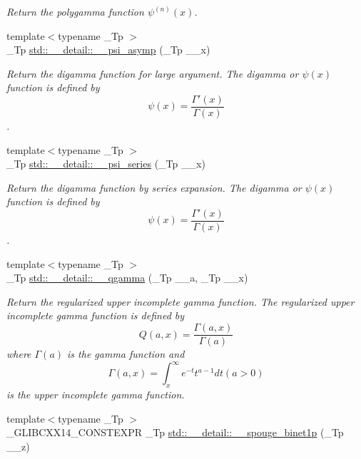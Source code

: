 \begin{DoxyCompactItemize}
\begin{DoxyCompactList}\small\item\em Return the polygamma function $ \psi^{(n)}(x) $. \end{DoxyCompactList}\item 
{\footnotesize template$<$typename \+\_\+\+Tp $>$ }\\\+\_\+\+Tp \hyperlink{namespacestd_1_1____detail_a2557b5d815b6667bc9228c1e8a2a16ae}{std\+::\+\_\+\+\_\+detail\+::\+\_\+\+\_\+psi\+\_\+asymp} (\+\_\+\+Tp \+\_\+\+\_\+x)
\begin{DoxyCompactList}\small\item\em Return the digamma function for large argument. The digamma or $ \psi(x) $ function is defined by \[ \psi(x) = \frac{\Gamma'(x)}{\Gamma(x)} \]. \end{DoxyCompactList}\item 
{\footnotesize template$<$typename \+\_\+\+Tp $>$ }\\\+\_\+\+Tp \hyperlink{namespacestd_1_1____detail_a378e78e1c3c08b8f146acf32a26e831a}{std\+::\+\_\+\+\_\+detail\+::\+\_\+\+\_\+psi\+\_\+series} (\+\_\+\+Tp \+\_\+\+\_\+x)
\begin{DoxyCompactList}\small\item\em Return the digamma function by series expansion. The digamma or $ \psi(x) $ function is defined by \[ \psi(x) = \frac{\Gamma'(x)}{\Gamma(x)} \]. \end{DoxyCompactList}\item 
{\footnotesize template$<$typename \+\_\+\+Tp $>$ }\\\+\_\+\+Tp \hyperlink{namespacestd_1_1____detail_acaac94504608c15edb7d96884ac1dc23}{std\+::\+\_\+\+\_\+detail\+::\+\_\+\+\_\+qgamma} (\+\_\+\+Tp \+\_\+\+\_\+a, \+\_\+\+Tp \+\_\+\+\_\+x)
\begin{DoxyCompactList}\small\item\em Return the regularized upper incomplete gamma function. The regularized upper incomplete gamma function is defined by \[ Q(a,x) = \frac{\Gamma(a,x)}{\Gamma(a)} \] where $ \Gamma(a) $ is the gamma function and \[ \Gamma(a,x) = \int_x^\infty e^{-t}t^{a-1}dt (a > 0) \] is the upper incomplete gamma function. \end{DoxyCompactList}\item 
{\footnotesize template$<$typename \+\_\+\+Tp $>$ }\\\+\_\+\+G\+L\+I\+B\+C\+X\+X14\+\_\+\+C\+O\+N\+S\+T\+E\+X\+PR \+\_\+\+Tp \hyperlink{namespacestd_1_1____detail_afa9284858d2bffbdc5d79fcbab68c307}{std\+::\+\_\+\+\_\+detail\+::\+\_\+\+\_\+spouge\+\_\+binet1p} (\+\_\+\+Tp \+\_\+\+\_\+z)

\end{DoxyCompactItemize}
